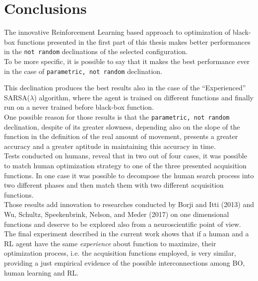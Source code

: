 \chapter{Conclusions}

The innovative Reinforcement Learning based approach to optimization of black-box functions presented in the first part of this thesis makes better performances in the {\tt not random} declinations of the selected configuration. \\

To be more specific, it is possible to say that it makes the best performance ever in the case of {\tt parametric, not random} declination.

This declination produces the best results also in the case of the \enquote{Experienced} SARSA($\lambda$) algorithm, where the agent is trained on different functions and finally run on a never trained before black-box function. \\

One possible reason for those results is that the {\tt parametric, not random} declination, despite of its greater slowness, depending also on the slope of the function in the definition of the real amount of movement, presents a greater accuracy and a greater aptitude in maintaining this accuracy in time. \\

Tests conducted on humans, reveal that in two out of four cases, it was possible to match human optimization strategy to one of the three presented acquisition functions. In one case it was possible to decompose the human search process into two different phases and then match them with two different acquisition functions. \\

Those results add innovation to researches conducted by Borji and Itti (2013) and Wu, Schultz, Speekenbrink, Nelson, and Meder (2017) on one dimensional functions and deserve to be explored also from a neuroscientific point of view. \\

The final experiment described in the current work shows that if a human and a RL agent have the same \textit{experience} about function to maximize, their optimization process, i.e. the acquisition functions employed, is very similar, providing a just empirical evidence of the possible interconnections among BO, human learning and RL.




